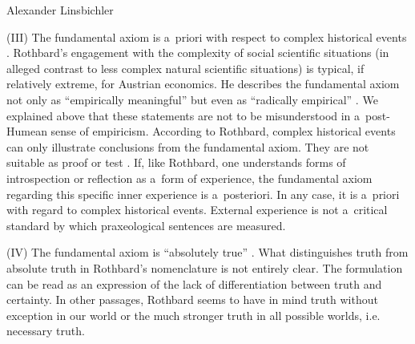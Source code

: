 \begin{artengenv}{Alexander Linsbichler}
\medskip

\noindent (III) The fundamental axiom is a~priori with respect to complex historical events 
\parencites[][p.318]{rothbard_defense_1957}[][p.25]{rothbard_praxeology:_1976}. %
 Rothbard's engagement with the complexity of social scientific situations (in alleged contrast to less complex natural scientific situations) is typical, if relatively extreme, for Austrian economics. He describes the fundamental axiom not only as ``empirically meaningful'' but even as ``radically empirical'' 
\parencite[][p.24]{rothbard_praxeology:_1976}. %
 We explained above that these statements are not to be misunderstood in a~post-Humean sense of empiricism. According to Rothbard, complex historical events can only illustrate conclusions from the fundamental axiom. They are not suitable as proof or test 
\parencites[][p.181]{rothbard_mises_1951}[][pp.944–945]{rothbard_praxeology_1951}. %
 If, like Rothbard, one understands forms of introspection or reflection as a~form of experience, the fundamental axiom regarding this specific inner experience is a~posteriori. In any case, it is a~priori with regard to complex historical events. External experience is not a~critical standard by which praxeological sentences are measured.

\medskip

\noindent (IV) The fundamental axiom is ``absolutely true'' 
\parencite[][pp.314]{rothbard_defense_1957}. %
 What distinguishes truth from absolute truth in Rothbard's nomenclature is not entirely clear. The formulation can be read as an expression of the lack of differentiation between truth and certainty. In other passages, Rothbard seems to have in mind truth without exception in our world or the much stronger truth in all possible worlds, i.e. necessary truth.
 
 \enlargethispage{1.5\baselineskip}


\end{artengenv}
